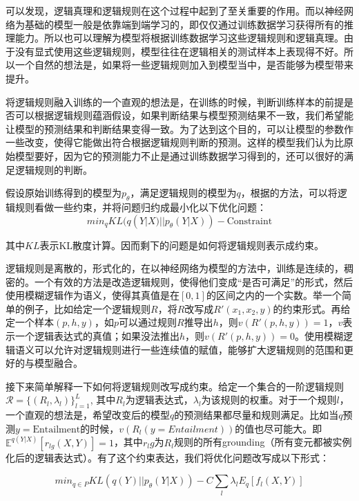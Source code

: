 \documentclass[UTF8,11pt,a4paper,nofonts]{ctexart}
\begin{document}
可以发现，逻辑真理和逻辑规则在这个过程中起到了至关重要的作用。而以神经网络为基础的模型一般是依靠端到端学习的，即仅仅通过训练数据学习获得所有的推理能力。所以也可以理解为模型将根据训练数据学习这些逻辑规则和逻辑真理。由于没有显式使用这些逻辑规则，模型往往在逻辑相关的测试样本上表现得不好。所以一个自然的想法是，如果将一些逻辑规则加入到模型当中，是否能够为模型带来提升。



将逻辑规则融入训练的一个直观的想法是，在训练的时候，判断训练样本的前提是否可以根据逻辑规则蕴涵假设，如果判断结果与模型预测结果不一致，我们希望能让模型的预测结果和判断结果变得一致。为了达到这个目的，可以让模型的参数作一些改变，使得它能做出符合根据逻辑规则判断的预测。这样的模型我们认为比原始模型要好，因为它的预测能力不止是通过训练数据学习得到的，还可以很好的满足逻辑规则的判断。

假设原始训练得到的模型为$p_\theta$，满足逻辑规则的模型为$q$，根据\cite{Hu2016HarnessingDN}的方法，可以将逻辑规则看做一些约束，并将问题归约成最小化以下优化问题：
\begin{equation}
min_{q} KL(q(Y|X) || p_\theta(Y|X)) - \text{Constraint}
\end{equation}

其中$KL$表示KL散度计算\cite{}。因而剩下的问题是如何将逻辑规则表示成约束。

逻辑规则是离散的，形式化的，在以神经网络为模型的方法中，训练是连续的，稠密的。一个有效的方法是改造逻辑规则，使得他们变成“是否可满足”的形式，然后使用模糊逻辑作为语义，使得其真值是在$[0,1]$的区间之内的一个实数。举一个简单的例子，比如给定一个逻辑规则$R$，将$R$改写成$R'(x_1,x_2,y)$的约束形式。再给定一个样本$(p,h,y)$，如$p$可以通过规则$R$推导出$h$，则$v(R'(p,h,y))=1$，$v$表示一个逻辑表达式的真值；如果没法推出$h$，则$v(R'(p,h,y))=0$。使用模糊逻辑语义可以允许对逻辑规则进行一些连续值的赋值，能够扩大逻辑规则的范围和更好的与模型融合。

接下来简单解释一下如何将逻辑规则改写成约束。给定一个集合的一阶逻辑规则$\mathcal{R}=\{(R_l,\lambda_l)\}^L_{l=1}$, 其中$R_l$为逻辑表达式，$\lambda_l$为该规则的权重。对于一个规则$l$，一个直观的想法是，希望改变后的模型$q$的预测结果都尽量和规则满足。比如当$q$预测$y=\text{Entailment}$的时候，$v(R_l(y=Entailment))$的值也尽可能大。即$\mathbb{E}^{q(Y|X)}[r_{lg}(X,Y)]=1$，其中$r_lg$为$R_l$规则的所有grounding（所有变元都被实例化后的逻辑表达式）。有了这个约束表达，我们将优化问题改写成以下形式：

\begin{equation}
min_{q \in P} KL(q(Y)|| p_\theta(Y|X)) - C \sum_l \lambda_l E_q[f_l(X,Y)]
\end{equation}
\end{document}
